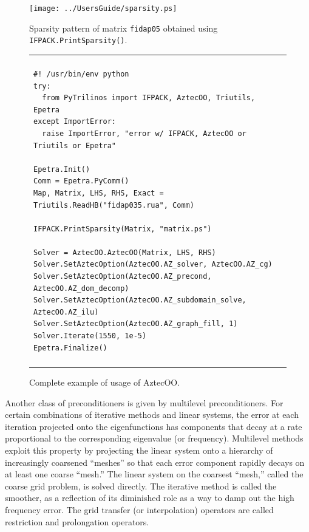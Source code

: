 \documentclass[10pt,relax]{SANDreport}
\begin{document}
\begin{figure}
\begin{center}
\texttt{[image: ../UsersGuide/sparsity.ps]}
\caption{Sparsity pattern of matrix {\tt fidap05} obtained using {\tt
  IFPACK.PrintSparsity()}.}
\label{fig:sparsity}
\end{center}
\end{figure}

\begin{figure}
\begin{center}
\begin{tabular}{| p{12cm} |}
\hline
\\
\footnotesize
\begin{minipage}{11.5cm}
\begin{verbatim}
#! /usr/bin/env python
try:
  from PyTrilinos import IFPACK, AztecOO, Triutils, Epetra
except ImportError:
  raise ImportError, "error w/ IFPACK, AztecOO or Triutils or Epetra"

Epetra.Init()
Comm = Epetra.PyComm()
Map, Matrix, LHS, RHS, Exact = Triutils.ReadHB("fidap035.rua", Comm)

IFPACK.PrintSparsity(Matrix, "matrix.ps")

Solver = AztecOO.AztecOO(Matrix, LHS, RHS)
Solver.SetAztecOption(AztecOO.AZ_solver, AztecOO.AZ_cg)
Solver.SetAztecOption(AztecOO.AZ_precond, AztecOO.AZ_dom_decomp)
Solver.SetAztecOption(AztecOO.AZ_subdomain_solve, AztecOO.AZ_ilu)
Solver.SetAztecOption(AztecOO.AZ_graph_fill, 1)
Solver.Iterate(1550, 1e-5)
Epetra.Finalize()
\end{verbatim}
\end{minipage}
\\
\\
\hline
\end{tabular}
\caption{Complete example of usage of AztecOO.}
\label{fig:aztecoo}
\end{center}
\end{figure}

\medskip

Another class of preconditioners is given by multilevel
preconditioners.
For certain combinations of iterative methods and
linear systems, the error at each iteration projected onto the
eigenfunctions has components that decay at a rate proportional to the
corresponding eigenvalue (or frequency).  Multilevel methods exploit
this property \cite{Briggs} by projecting the linear system onto a
hierarchy of increasingly coarsened ``meshes'' so that each error
component rapidly decays on at least one coarse ``mesh.''  The linear
system on the coarsest ``mesh,'' called the coarse grid problem, is
solved directly.  The iterative method is called the smoother, as a
reflection of its diminished role as a way to damp out the high
frequency error.  The grid transfer (or interpolation) operators are
called restriction and prolongation
operators.
\end{document}
